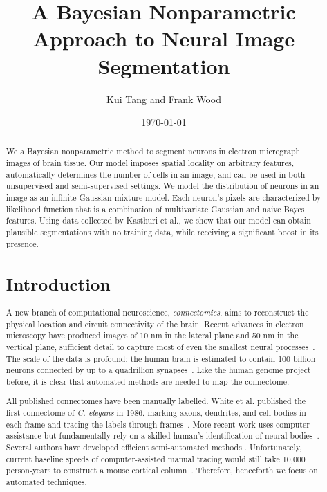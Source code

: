 \documentclass[draft]{article}
\begin{document}
\listoffixmes

\title{A Bayesian Nonparametric Approach to Neural Image Segmentation}

\author{Kui Tang and Frank Wood}
\date{\today}
\maketitle
\begin{abstract}
We  a Bayesian nonparametric method to segment neurons in electron micrograph images of brain tissue. Our model imposes spatial locality on arbitrary features, automatically determines the number of cells in an image, and can be used in both unsupervised and semi-supervised settings. We model the distribution of neurons in an image as an infinite Gaussian mixture model. Each neuron's pixels are characterized by likelihood function that is a combination of multivariate Gaussian and naive Bayes features. Using data collected by Kasthuri et al., we show that our model can obtain plausible segmentations with no training data, while receiving a significant boost in its presence.

\section{Introduction}
A new branch of computational neuroscience, \emph{connectomics}, aims to reconstruct the physical location and circuit connectivity of the brain. Recent advances in electron microscopy have produced images of 10 nm in the lateral plane and 50 nm in the vertical plane, sufficient detail to capture most of even the smallest neural processes~\cite{Briggman2006}. The scale of the data is profound; the human brain is estimated to contain 100 billion neurons connected by up to a quadrillion synapses~\cite{Kasthuri2010}. Like the human genome project before, it is clear that automated methods are needed to map the connectome.

All published connectomes have been manually labelled. White et al. published the first connectome of \emph{C. elegans} in 1986, marking axons, dendrites, and cell bodies in each frame and tracing the labels through frames~\cite{White12111986}. More recent work uses computer assistance but fundamentally rely on a skilled human's identification of neural bodies~\cite{Jarrell2012,Bock2011Roberts2011}. Several authors have developed efficient semi-automated methods \cite{Roberts2011,Unger2009}. Unfortunately, current baseline speeds of computer-assisted manual tracing would still take 10,000 person-years to construct a mouse cortical column~\cite{Briggman2006}. Therefore, henceforth we focus on automated techniques.


\end{abstract}
\end{document}
